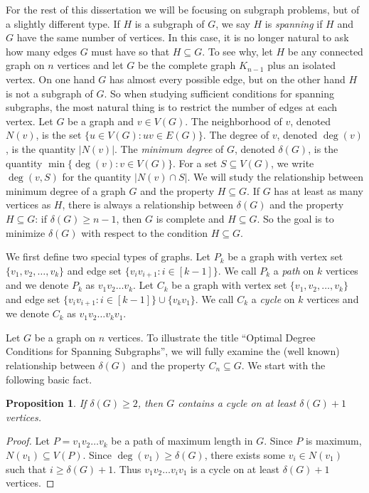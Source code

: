 \documentclass[oneside,12pt]{memoir}
\newtheorem{proposition}[theorem]{Proposition}
\begin{document}
For the rest of this dissertation we will be focusing on subgraph problems, but of a slightly different type.  If $H$ is a subgraph of $G$, we say $H$ is \emph{spanning} if $H$ and $G$ have the same number of vertices.  In this case, it is no longer natural to ask how many edges $G$ must have so that $H\subseteq G$.  To see why, let $H$ be any connected graph on $n$ vertices and let $G$ be the complete graph $K_{n-1}$ plus an isolated vertex.  On one hand $G$ has almost every possible edge, but on the other hand $H$ is not a subgraph of $G$.  So when studying sufficient conditions for spanning subgraphs, the most natural thing is to restrict the number of edges at each vertex.  Let $G$ be a graph and $v\in V(G)$. The neighborhood of $v$, denoted $N(v)$, is the set $\{u\in V(G):uv\in E(G)\}$.  The degree of $v$, denoted $\deg(v)$, is the quantity $|N(v)|$. The \emph{minimum degree} of $G$, denoted $\delta(G)$, is the quantity $\min\{\deg(v):v\in V(G)\}$.  For a set $S\subseteq V(G)$, we write $\deg(v, S)$ for the quantity $|N(v)\cap S|$.  We will study the relationship between minimum degree of a graph $G$
and the property $H\subseteq G$.  If $G$ has at least as many vertices
as $H$, there is always a relationship between $\delta(G)$ and the
property $H\subseteq G$: if $\delta(G)\geq n-1$, then $G$ is complete
and $H\subseteq G$.  So the goal is to minimize $\delta(G)$ with
respect to the condition $H\subseteq G$.

We first define two special types of graphs. Let $P_k$ be a graph with vertex set $\{v_1, v_2, \dots, v_k\}$ and edge set $\{v_iv_{i+1}:
i\in[k-1]\}$.  We call $P_k$ a \emph{path} on $k$ vertices and we
denote $P_k$ as $v_1v_2\dots v_k$.  Let $C_k$ be a graph with vertex
set $\{v_1, v_2, \dots, v_k\}$ and edge set $\{v_iv_{i+1}:
i\in[k-1]\}\cup \{v_kv_1\}$.  We call $C_k$ a \emph{cycle} on $k$
vertices and we denote $C_k$ as $v_1v_2\dots v_kv_1$.

Let $G$ be a graph on $n$ vertices.  To illustrate the title ``Optimal Degree Conditions for Spanning Subgraphs'', we will fully examine the (well known) relationship between $\delta(G)$ and the property $C_n\subseteq G$.  We start with the following basic fact.

\begin{proposition}\label{delta+1}
If $\delta(G)\geq 2$, then $G$ contains a cycle on at least
$\delta(G)+1$ vertices.
\end{proposition}

\begin{proof}
Let $P=v_1v_2\dots v_k$ be a path of maximum length in $G$.  Since $P$
is maximum, $N(v_1)\subseteq V(P)$.  Since $\deg(v_1)\geq \delta(G)$,
there exists some $v_i\in N(v_1)$ such that $i\geq \delta(G)+1$.  Thus
$v_1v_2\dots v_iv_1$ is a cycle on at least $\delta(G)+1$ vertices.
\end{proof}
\end{document}
